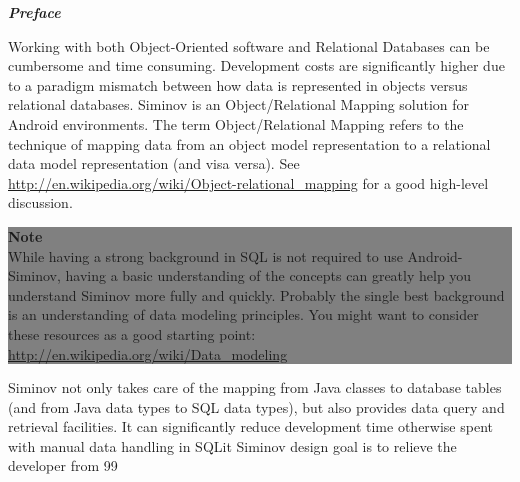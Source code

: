 \newpage
{}
\begin{flushleft}
	\textbf{\emph{\Large{Preface}}}
\end{flushleft}

\small
Working with both Object-Oriented software and Relational Databases can be cumbersome and time consuming. Development costs are significantly higher due to a paradigm mismatch between how data is represented in objects versus relational databases. Siminov is an Object/Relational Mapping solution for Android environments. The term Object/Relational Mapping refers to the technique of mapping data from an object model representation to a relational data model representation (and visa versa). See \url{http://en.wikipedia.org/wiki/Object-relational_mapping} for a good high-level discussion.


\begin{center}
	\colorbox{grey}{
		\parbox[t]{.8\linewidth}{
			\fontsize{11pt}{11pt}\selectfont %
			\vspace*{0.7cm} %
		
			\hfill \textbf{Note} \\
			\hfill While having a strong background in SQL is not required to use Android-Siminov, having a basic understanding of the concepts can greatly help you understand Siminov more fully and quickly. Probably the single best background is an understanding of data modeling principles. You might want to consider these resources as a good starting point: \url{http://en.wikipedia.org/wiki/Data_modeling}\\
		
			\vspace*{0.7cm} %
		}
}

\end{center}


Siminov not only takes care of the mapping from Java classes to database tables (and from Java data types to SQL data types), but also provides data query and retrieval facilities. It can significantly reduce development time otherwise spent with manual data handling in SQLit Siminov design goal is to relieve the developer from 99%

